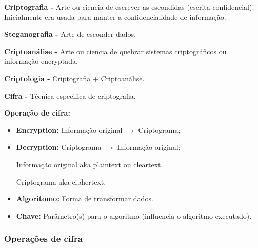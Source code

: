 \documentclass{article}
\begin{document}
\begin{flushleft}
  \textbf{Criptografia -} Arte ou ciencia de escrever as escondidas
  (escrita confidencial). Inicialmente era usada para manter a confidencialidade
  de informação.

  \vspace{2mm}

  \textbf{Steganografia -} Arte de esconder dados.

  \vspace{2mm}

  \textbf{Criptoanálise -} Arte ou ciencia de quebrar sistemas
  criptográficos ou informação encryptada.

  \vspace{2mm}

  \textbf{Criptologia -} Criptografia + Criptoanálise.

  \vspace{2mm}

  \textbf{Cifra -} Técnica especifica de criptografia.

  \vspace{2mm}

  \textbf{Operação de cifra:}
  \begin{itemize}
    \item \textbf{Encryption:} Informação original $\rightarrow$ Criptograma;
    \item \textbf{Decryption:} Criptograma $\rightarrow$ Informação original;
    
    \vspace{2mm}

    Informação original aka plaintext ou cleartext.

    Criptograma aka ciphertext.

    \vspace{2mm}

    \item \textbf{Algoritomo:} Forma de transformar dados.
    \item \textbf{Chave:} Parâmetro(s) para o algoritmo (influencia
    o algoritmo executado).
  \end{itemize}

  \subsubsection{Operações de cifra}


\end{flushleft}
\end{document}
